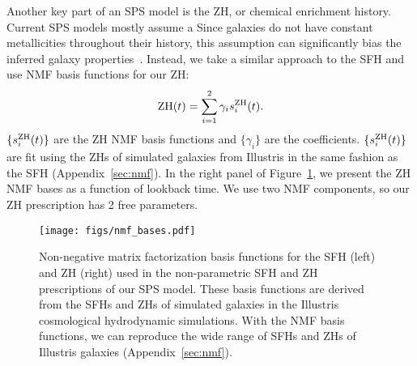 Another key part of an SPS model is the ZH, or chemical enrichment history. 
Current SPS models mostly assume a
Since galaxies do not have constant metallicities throughout their history,
this assumption can significantly bias the inferred galaxy
properties~\citep{thorne2021}. 
Instead, we take a similar approach to the SFH and use NMF basis functions for
our ZH:
\begin{equation}
    {\rm ZH}(t) = \sum\limits_{i=1}^2 \gamma_i s_i^{\rm ZH}(t).
\end{equation} 
$\{s_i^{\rm ZH}(t)\}$ are the ZH NMF basis functions and $\{\gamma_i\}$ are the
coefficients. 
$\{s_i^{\rm ZH}(t)\}$ are fit using the ZHs of simulated galaxies from
Illustris in the same fashion as the SFH (Appendix~\ref{sec:nmf}). 
In the right panel of Figure~\ref{fig:nmf}, we present the ZH NMF bases as a
function of lookback time. 
We use two NMF components, so our ZH prescription has 2 free parameters. 

\begin{figure}
\begin{center}
\texttt{[image: figs/nmf\_bases.pdf]} 
    \caption{
        Non-negative matrix factorization basis functions for the SFH (left)
        and ZH (right) used in the non-parametric SFH and ZH prescriptions of
        our SPS model. 
        These basis functions are derived from the SFHs and ZHs of simulated
        galaxies in the Illustris cosmological hydrodynamic simulations. 
        With the NMF basis functions, we can reproduce the wide range of SFHs
        and ZHs of Illustris galaxies (Appendix~\ref{sec:nmf}).  
    }
    \label{fig:nmf}
\end{center}
\end{figure}


